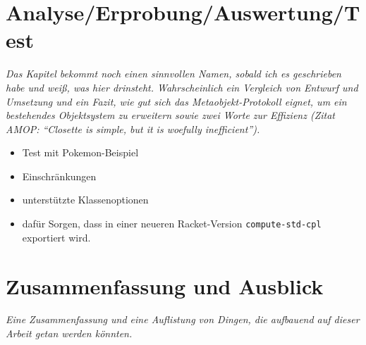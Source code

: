 
\pagestyle{diplHeadings}





\setcounter{page}{1}
\tableofcontents
\cleardoublepage 

\setcounter{page}{1} 
\mainmatter  
{}

 

 






\chapter{Analyse/Erprobung/Auswertung/Test}
\textit{Das Kapitel bekommt noch einen sinnvollen Namen, sobald ich es geschrieben habe und weiß, was hier drinsteht. Wahrscheinlich ein Vergleich von Entwurf und Umsetzung und ein Fazit, wie gut sich das Metaobjekt-Protokoll eignet, um ein bestehendes Objektsystem zu erweitern sowie zwei Worte zur Effizienz (Zitat AMOP: ``Closette is simple, but it is woefully inefficient'').}

\begin{itemize}
 \item Test mit Pokemon-Beispiel
 \item Einschränkungen
 \item unterstützte Klassenoptionen
 \item dafür Sorgen, dass in einer neueren Racket-Version \texttt{compute-std-cpl} exportiert wird.
\end{itemize}


\chapter{Zusammenfassung und Ausblick}
\textit{Eine Zusammenfassung und eine Auflistung von Dingen, die aufbauend auf dieser Arbeit getan werden könnten.}

\cleardoublepage
{}
{}

  
\cleardoublepage


\cleardoublepage




